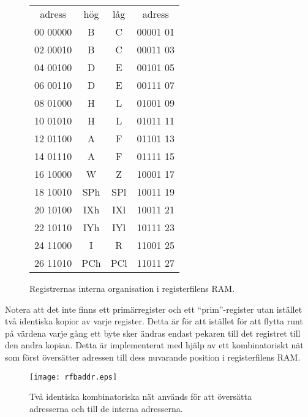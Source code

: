 \documentclass[main.tex]{subfiles}
\begin{document}
\begin{figure}[b!]
    \center
    \ttfamily\arraybackslash
    \begin{tabular}{r|c|c|l}
        \multicolumn{1}{c}{adress} &
        \multicolumn{1}{c}{hög} & \multicolumn{1}{c}{låg} &
        \multicolumn{1}{c}{adress} \\ \cline{2-3}
        00 00000 & B   & C   & 00001 01 \\ \cline{2-3}
        02 00010 & B   & C   & 00011 03 \\ \cline{2-3}
        04 00100 & D   & E   & 00101 05 \\ \cline{2-3}
        06 00110 & D   & E   & 00111 07 \\ \cline{2-3}
        08 01000 & H   & L   & 01001 09 \\ \cline{2-3}
        10 01010 & H   & L   & 01011 11 \\ \cline{2-3}
        12 01100 & A   & F   & 01101 13 \\ \cline{2-3}
        14 01110 & A   & F   & 01111 15 \\ \cline{2-3}
        16 10000 & W   & Z   & 10001 17 \\ \cline{2-3}
        18 10010 & SPh & SPl & 10011 19 \\ \cline{2-3}
        20 10100 & IXh & IXl & 10011 21 \\ \cline{2-3}
        22 10110 & IYh & IYl & 10111 23 \\ \cline{2-3}
        24 11000 & I   & R   & 11001 25 \\ \cline{2-3}
        26 11010 & PCh & PCl & 11011 27 \\ \cline{2-3}
    \end{tabular}
    \caption{Registrernas interna organisation i registerfilens RAM.}
    \label{fig:rfint}
\end{figure}

Notera att det inte finns ett primärregister och ett ``prim''-register utan
istället två identiska kopior av varje register. Detta är för att istället för
att flytta runt på värdena varje gång ett byte sker ändras endast pekaren
till det registret till den andra kopian. Detta är implementerat med hjälp av
ett kombinatoriskt nät som först översätter adressen till dess nuvarande
position i registerfilens RAM.

\begin{figure}[b!]
    \center
    \texttt{[image: rfbaddr.eps]}
    \caption{Två identiska kombinatoriska nät används för att översätta
    adresserna  och  till de interna adresserna.}
    \label{fig:rfbaddr}
\end{figure}
\end{document}
